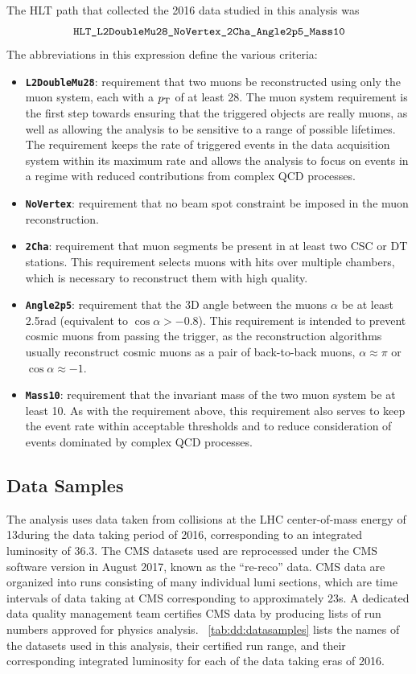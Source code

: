 The HLT path that collected the 2016 data studied in this analysis was
$$\texttt{HLT\_L2DoubleMu28\_NoVertex\_2Cha\_Angle2p5\_Mass10}$$
The abbreviations in this expression define the various criteria:
\begin{itemize}
  \item \texttt{\textbf{L2DoubleMu28}}: requirement that two muons be reconstructed using only the muon system, each with a $p_{\mathrm{T}}$ of at least 28\GeV. The muon system requirement is the first step towards ensuring that the triggered objects are really muons, as well as allowing the analysis to be sensitive to a range of possible lifetimes. The \pT requirement keeps the rate of triggered events in the data acquisition system within its maximum rate and allows the analysis to focus on events in a regime with reduced contributions from complex QCD processes.
  \item \texttt{\textbf{NoVertex}}: requirement that no beam spot constraint be imposed in the muon reconstruction.
  \item \texttt{\textbf{2Cha}}: requirement that muon segments be present in at least two CSC or DT stations. This requirement selects muons with hits over multiple chambers, which is necessary to reconstruct them with high quality.
  \item \texttt{\textbf{Angle2p5}}: requirement that the 3D angle between the muons $\alpha$ be at least 2.5\unit{rad} (equivalent to $\cos{\alpha} > -0.8$). This requirement is intended to prevent cosmic muons from passing the trigger, as the reconstruction algorithms usually reconstruct cosmic muons as a pair of back-to-back muons, \ie $\alpha \approx \pi$ or $\cos{\alpha} \approx -1$.
  \item \texttt{\textbf{Mass10}}: requirement that the invariant mass of the two muon system \mMuMu be at least 10\GeV. As with the \pT requirement above, this requirement also serves to keep the event rate within acceptable thresholds and to reduce consideration of events dominated by complex QCD processes.
\end{itemize}

\subsection{Data Samples}
The analysis uses data taken from \pp collisions at the LHC center-of-mass energy of 13\TeV during the data taking period of 2016, corresponding to an integrated luminosity of 36.3\fbinv.
The CMS datasets used are reprocessed under the CMS software version  in August 2017, known as the ``re-reco'' data.
CMS data are organized into runs consisting of many individual lumi sections, which are time intervals of data taking at CMS corresponding to approximately 23\unit{s}.
A dedicated data quality management team certifies CMS data by producing lists of run numbers approved for physics analysis.
\Tab~\ref{tab:dd:datasamples} lists the names of the datasets used in this analysis, their certified run range, and their corresponding integrated luminosity for each of the data taking eras of 2016.

